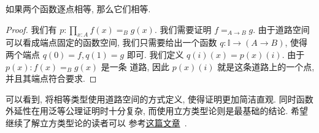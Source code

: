 \begin{theorem}
如果两个函数逐点相等, 那么它们相等.
\end{theorem}
\begin{proof}
我们有 \(p : \prod_{x : A} f(x) =_B g(x)\). 我们需要证明
\(f =_{A\to B} g\). 由于道路空间可以看成端点固定的函数空间,
我们只需要给出一个函数 \(q : \mathbb I \to (A \to B)\), 使得
两个端点 \(q(0) = f, q(1) = g\) 即可. 我们定义
\(q(i)(x) = p(x)(i)\). 由于 \(p(x) : f(x) =_B g(x)\) 是一条
道路, 因此 \(p(x)(i)\) 就是这条道路上的一个点, 并且其端点符合要求.
\end{proof}

可以看到, 将相等类型使用道路空间的方式定义, 使得证明更加简洁直观.
同时函数外延性在用泛等公理证明时十分复杂, 而使用立方类型论则是最基础的结论.
希望继续了解立方类型论的读者可以
参考\href{https://1lab.dev/1Lab.intro.html}{这篇文章}~\cite{amelia:2023:1lab}.
